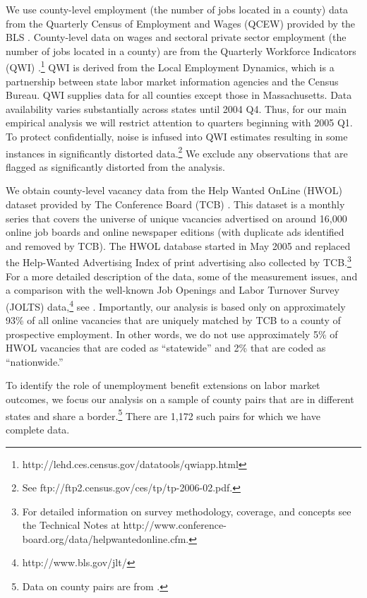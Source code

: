 \documentclass[12pt]{article}
\newcommand{\1}{\mathbf{1}}
\begin{document}
We use county-level employment (the number of jobs located in a county) data from the Quarterly Census of Employment and Wages (QCEW) provided by the BLS \citep{data:bls-qcew}.
County-level data on wages and sectoral private sector employment (the number of jobs located in a county) are from the Quarterly Workforce Indicators (QWI) \citep{data:census-lehd-qwi}.\footnote{http://lehd.ces.census.gov/datatools/qwiapp.html} QWI is derived from the Local Employment Dynamics, which is a partnership between state labor market information agencies and the Census Bureau. QWI supplies data for all counties except those in Massachusetts. Data availability varies substantially across states until 2004 Q4. Thus, for our main empirical analysis we will restrict attention to quarters beginning with 2005 Q1. To protect confidentially, noise is infused into QWI estimates resulting in some instances in significantly distorted data.\footnote{See ftp://ftp2.census.gov/ces/tp/tp-2006-02.pdf.} We exclude any observations that are flagged as significantly distorted from the analysis.


We obtain county-level vacancy data from the Help Wanted OnLine (HWOL) dataset provided by The Conference Board (TCB) \citep{data:tcb-hwol}. This dataset is a monthly series that covers the universe of unique vacancies advertised on around 16,000 online job boards and online newspaper editions (with duplicate ads identified and removed by TCB). The HWOL database started in May 2005 and replaced the Help-Wanted Advertising Index of print advertising also collected by TCB.\footnote{For detailed information on survey methodology, coverage, and concepts see the Technical Notes at http://www.conference-board.org/data/helpwantedonline.cfm.} For a more detailed description of the data, some of the measurement issues, and a comparison with the well-known Job Openings and Labor Turnover Survey (JOLTS) data,\footnote{http://www.bls.gov/jlt/} see \citet{sahin+etal:2012}. Importantly, our analysis is based only on approximately 93\% of all online vacancies that are uniquely matched by TCB to a county of prospective employment. In other words, we do not use approximately 5\% of HWOL vacancies that are coded as ``statewide'' and 2\% that are coded as ``nationwide.''



To identify the role of unemployment benefit extensions on labor market outcomes, we focus our analysis on a sample of county pairs that are in different states and share a border.\footnote{Data on county pairs are from \citet{dube+etal:10} \citep{data:dlr-countypairs}.} There are 1,172 such pairs for which we have complete data.
\end{document}
